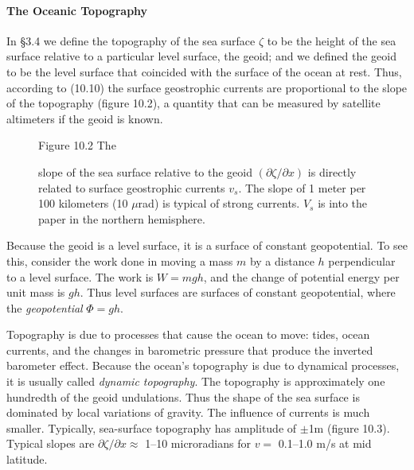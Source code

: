 \paragraph{The Oceanic Topography}
In \S 3.4 we define the topography of the sea surface $\zeta$
to be the height of the sea surface relative to a particular level surface, the geoid; and we
defined the geoid to be the level surface that coincided with the surface of the ocean at
rest.  Thus, according to (10.10) the surface geostrophic currents are proportional to the
slope of the topography (figure 10.2), a quantity that can be measured by satellite altimeters
if the geoid is known.

\begin{figure}[h!]
\vspace{-2ex}
\footnotesize
Figure 10.2 The \rule{0mm}{3ex}slope of the sea surface relative to the geoid
$(\partial\zeta/\partial x)$ is directly related to surface geostrophic currents $v_s$.
The slope of 1 meter per 100 kilometers (10 $\mu$rad) is typical of strong currents.
$V_s$ is into the paper in the northern hemisphere.
\label{fig:geostrophicsketch}
\vspace{-2ex}
\end{figure}

Because the geoid is a level surface, it is a surface of constant geopotential. To see this, consider the work done in moving a mass $m$ by a distance $h$ perpendicular to a level surface. The work is $W=mgh$, and the change of potential energy per unit mass is $gh$. Thus level surfaces are surfaces of constant geopotential, where the \textit{geopotential} $\Phi = gh$.

Topography is due to processes that cause the ocean to move: tides, ocean currents, and
the changes in barometric pressure that produce the inverted barometer effect. Because
the ocean's topography is due to dynamical processes, it is usually called
\textit{dynamic topography}. The topography is approximately one
hundredth of the geoid undulations. Thus the shape of the sea surface is
dominated by local variations of gravity. The influence of currents is much smaller.
Typically, sea-surface topography has amplitude of $\pm$1m (figure 10.3). Typical slopes are
$\partial\zeta/\partial x \approx $ 1--10 microradians for $v = $ 0.1--1.0 m/s at mid latitude.

